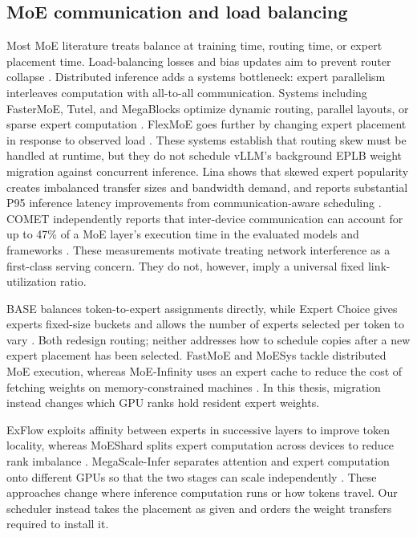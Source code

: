 \label{ch:related-work}

\subsection{MoE communication and load balancing}

Most MoE literature treats balance at training time, routing time, or expert
placement time. Load-balancing losses and bias updates aim to prevent router
collapse \cite{fedus2021switch,wang2024lossfree}. Distributed inference adds a
systems bottleneck: expert parallelism interleaves computation with all-to-all
communication. Systems including FasterMoE, Tutel, and MegaBlocks optimize
dynamic routing, parallel layouts, or sparse expert computation
\cite{he2022fastermoe,hwang2023tutel,gale2023megablocks}. FlexMoE goes further
by changing expert placement in response to observed load
\cite{nie2023flexmoe}. These systems establish that routing skew must be handled
at runtime, but they do not schedule vLLM's background EPLB weight migration
against concurrent inference. Lina shows that skewed expert popularity creates imbalanced
transfer sizes and bandwidth demand, and reports substantial P95 inference
latency improvements from communication-aware scheduling
\cite{li2023lina}. COMET independently reports that inter-device
communication can account for up to 47\% of a MoE layer's execution time in
the evaluated models and frameworks \cite{zhang2025comet}. These measurements
motivate treating network interference as a first-class serving concern. They
do not, however, imply a universal fixed link-utilization ratio.

BASE balances token-to-expert assignments directly, while Expert Choice
gives experts fixed-size buckets and allows the number of experts selected per
token to vary \cite{lewis2021base,zhou2022expertchoice}. Both redesign routing;
neither addresses how to schedule copies after a new expert placement has
been selected. FastMoE and MoESys tackle distributed MoE execution, whereas
MoE-Infinity uses an expert cache to reduce the cost of fetching weights on
memory-constrained machines
\cite{he2021fastmoe,yu2022moesys,xue2024moeinfinity}. In this thesis, migration
instead changes which GPU ranks hold resident expert weights.

ExFlow exploits affinity between experts in successive layers to improve token
locality, whereas MoEShard splits expert computation across devices to reduce
rank imbalance \cite{yao2024exflow,balmau2025moeshard}. MegaScale-Infer separates
attention and expert computation onto different GPUs so that the two stages can
scale independently \cite{zhu2025megascaleinfer}. These approaches change where
inference computation runs or how tokens travel. Our scheduler instead takes
the placement as given and orders the weight transfers required to install it.


